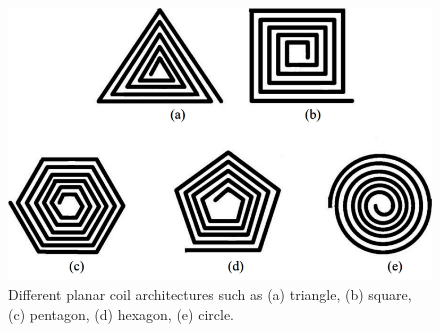 \begin{figure}[th]
    \centering
    \includegraphics[scale=0.4]{Chapters/Chapter2/PCB_coils/Figures/coils_shapes.png}
    \caption[Coils Shapes]{Different planar coil architectures such as (a) triangle, (b) square, (c)
    pentagon, (d) hexagon, (e) circle.}
    \label{fig: Coils Shapes}
\end{figure}